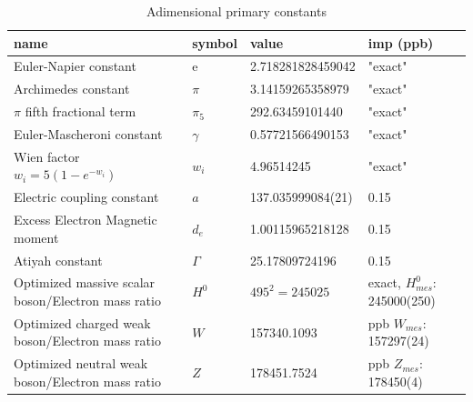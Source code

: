 \documentclass[a4paper,9pt]{article}
\newcounter{col}
\begin{document}
\begin{table}
\caption[Table \ref{tab:2:table2}: Adimensional primary constants.]{Adimensional primary constants}
\label{tab:2:table2}
  \hskip-2.0cm\begin{tabular}{llll}
    \toprule
    \cmidrule(r){1-4}
    name & symbol    & value & imp (ppb) \\
    \midrule
    
    Euler-Napier constant  & e    & 2.718281828459042 & "exact" \\    
    Archimedes constant & $\pi$    & 3.14159265358979 & "exact" \\    
    $\pi$ fifth fractional term & $\pi_5$    & 292.63459101440 & "exact" \\ 
    Euler-Mascheroni constant & $\gamma$    & 0.57721566490153 & "exact" \\    
    Wien factor $ w_i = 5(1-e^{-w_i})$ &  $w_i$  & 4.96514245  & "exact" \\
     
    Electric coupling constant  & $a$    & 137.035999084(21) & 0.15 \\
    Excess Electron Magnetic moment  & $d_e$    & 1.00115965218128 & 0.15 \\
    Atiyah constant & $\Gamma$    & 25.17809724196  & 0.15 \\ 
    Optimized massive scalar boson/Electron mass ratio  & $H^0$ & $ 495^2 = 245025$  & exact, $H^0_{mes}$: 245000(250)  \\
    
    Optimized  charged weak  boson/Electron mass ratio  & $W$ & 157340.1093  & ppb\cite{Sanchez2} $W_{mes}$: 157297(24)  \\     
    
    Optimized  neutral weak boson/Electron mass ratio  & $Z$ & 178451.7524  & ppb\cite{Sanchez2} $Z_{mes}$: 178450(4)\\     
   

\end{tabular}
\end{table}
\end{document}
